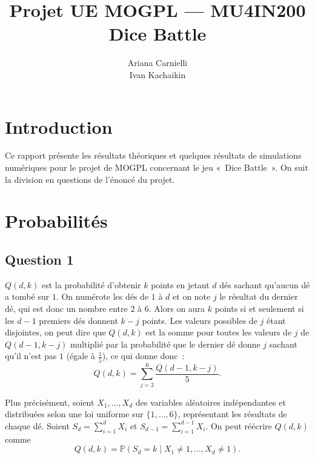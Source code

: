 \documentclass[a4paper,11pt]{amsart}
\theoremstyle{plain}
\begin{document}

\pagestyle{plain}

\title{Projet UE MOGPL --- MU4IN200 \\ Dice Battle}
\author{Ariana Carnielli \\ Ivan Kachaikin}
\date{}

\maketitle



\section{Introduction}

Ce rapport présente les résultats théoriques et quelques résultats de simulations numériques pour le projet de MOGPL concernant le jeu «~Dice Battle~». On suit la division en questions de l'énoncé du projet.

\section{Probabilités}

\subsection{Question 1}

$Q(d,k)$ est la probabilité d'obtenir $k$ points en jetant $d$ dés sachant qu'aucun dé a tombé sur $1$. On numérote les dés de $1$ à $d$ et on note $j$ le résultat du dernier dé, qui est donc un nombre entre $2$ à $6$. Alors on aura $k$ points si et seulement si les $d-1$ premiers dés donnent $k-j$ points. Les valeurs possibles de $j$ étant disjointes, on peut dire que $Q(d, k)$ est la somme pour toutes les valeurs de $j$ de $Q(d-1, k-j)$ multiplié par la probabilité que le dernier dé donne $j$ sachant qu'il n'est pas $1$ (égale à $\frac{1}{5}$), ce qui donne donc~:
\begin{equation}
\label{RecurrenceQ}
Q(d, k) = \sum_{j=2}^6 \frac{Q(d-1, k-j)}{5}.
\end{equation}

Plus précisément, soient $X_1, \dotsc, X_d$ des variables aléatoires indépendantes et distribuées selon une loi uniforme sur $\{1, \dotsc, 6\}$, représentant les résultats de chaque dé. Soient $S_d = \sum_{i=1}^d X_i$ et $S_{d-1} = \sum_{i=1}^{d-1} X_i$. On peut réécrire $Q(d, k)$ comme
\[
Q(d, k) = \mathbb P(S_d = k \mid X_1 \neq 1, \dotsc, X_d \neq 1).
\]
\end{document}
